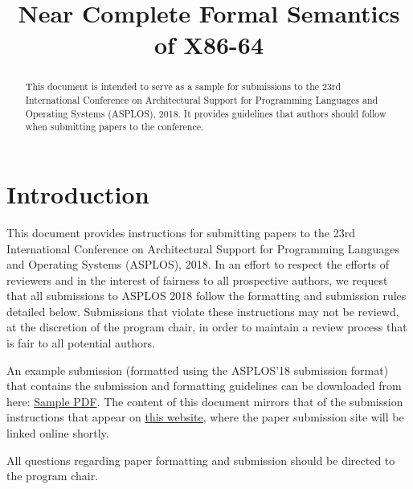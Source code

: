 \documentclass[pageno]{jpaper}
\begin{document}
\title{
Near Complete Formal Semantics of X86-64}

\date{}
\maketitle

\thispagestyle{empty}

\begin{abstract}

This document is intended to serve as a sample for submissions to the
23rd International Conference on Architectural Support for Programming
Languages and Operating Systems (ASPLOS), 2018.  It provides
guidelines that authors should follow when submitting papers to the
conference.

\end{abstract}

\section{Introduction}

This document provides instructions for submitting papers to the 23rd
International Conference on Architectural Support for Programming
Languages and Operating Systems (ASPLOS), 2018.  In an effort to
respect the efforts of reviewers and in the interest of fairness to
all prospective authors, we request that all submissions to ASPLOS
2018 follow the formatting and submission rules detailed below.
Submissions that violate these instructions may not be reviewd, at the
discretion of the program chair, in order to maintain a review process
that is fair to all potential authors.

An example submission (formatted using the ASPLOS'18 submission
format) that contains the submission and formatting guidelines can be
downloaded from here:
\href{https://www.asplos2018.org/wp-content/uploads/2017/07/asplos18-template.pdf}{Sample PDF}. The content of
this document mirrors that of the submission instructions that appear
on \href{https://www.asplos2018.org/submissions/}{this
website}, where the paper submission site will be linked online
shortly.

All questions regarding paper formatting and submission should be directed
to the program chair.
\end{document}
